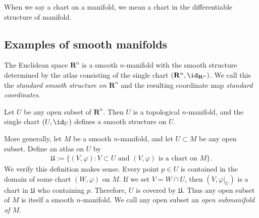 \begin{notation}
    When we say a chart on a manifold, we mean a chart in the differentiable structure of manifold.
\end{notation}

\subsection{Examples of smooth manifolds}

\begin{example}
    The Euclidean space $\mathbf{R}^n$ is a smooth $n$-manifold with the smooth structure determined by the atlas consisting of the single chart $(\mathbf{R}^n, \id_{\mathbf{R}^n})$. We call this the \emph{standard smooth structure on $\mathbf{R}^n$} and the resulting coordinate map \emph{standard coordinates}.
\end{example}

\begin{comment}
\begin{example}[Finite-dimensional vector spaces]
    Let $V$ be a finite-dimensional vector space over $\mathbf{R}^n$. Any norm on $V$ determines a topology, which is independent of the choice of norm. With this topology, $V$ is a topological $n$-manifold, and has a natural smooth structure defined as follows. Every basis $(v_j)_{1 \leq j \leq n}$ for $V$ defines a basis isomorphism $v : \mathbf{R}^n \to V$ by
        \begin{align}
            v(x) := \sum_{j = 1}^{n}x_iv_i.
        \end{align}
    This map is a homeomorphism, so $(V, v^{-1})$ is a chart.
\end{example}
\end{comment}

\begin{example}
    Let $U$ be any open subset of $\mathbf{R}^n$. Then $U$ is a topological $n$-manifold, and the single chart $(U, \id_U)$ defines a smooth structure on $U$.

    More generally, let $M$ be a smooth $n$-manifold, and let $U \subset M$ be any open subset. Define an atlas on $U$ by
    \begin{align*}
        \mathfrak{U} := \{(V, \varphi): V \subset U \text{ and } (V, \varphi) \text{ is a chart on }M\}.
    \end{align*}
    We verify this definition makes sense. Every point $p \in U$ is contained in the domain of some chart $(W, \varphi)$ on $M$. If we set $V = W \cap U$, then $(V, \varphi|_U)$ is a chart in $\mathfrak{U}$ who containing $p$. Therefore, $U$ is covered by $\mathfrak{U}$. Thus any open subset of $M$ is itself a smooth $n$-manifold. We call any open subset an \emph{open submanifold of $M$}.
\end{example}

